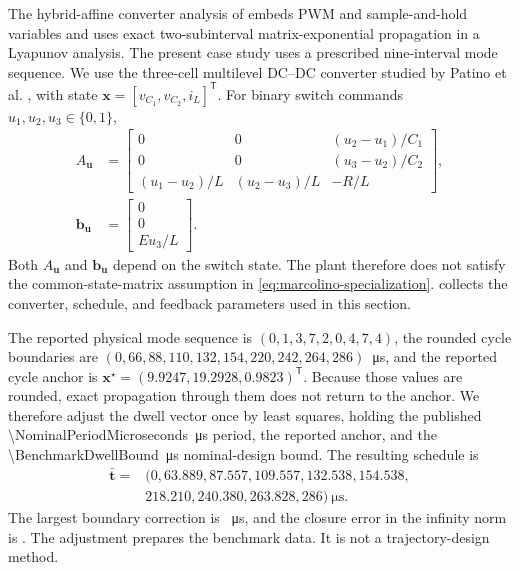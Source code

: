 \documentclass[pdflatex,iicol,sn-mathphys-ay]{sn-jnl}
\newcommand{\vect}[1]{\bm{#1}}
\begin{document}
The hybrid-affine converter analysis of \cite{albea2021hybridAffinePwm} embeds PWM and sample-and-hold variables and uses exact two-subinterval matrix-exponential propagation in a Lyapunov analysis. The present case study uses a prescribed nine-interval mode sequence. We use the three-cell multilevel DC--DC converter studied by Patino et al. \cite{patino2010}, with state $\vect{x}=[v_{C_1},v_{C_2},i_L]^{\mathsf T}$. For binary switch commands $u_1,u_2,u_3\in\{0,1\}$,
\begin{equation}
\begin{aligned}
A_{\vect{u}}&=
\begin{bmatrix}
0&0&(u_2-u_1)/C_1\\
0&0&(u_3-u_2)/C_2\\
(u_1-u_2)/L&(u_2-u_3)/L&-R/L
\end{bmatrix},\\
\vect{b}_{\vect{u}}&=\begin{bmatrix}0\\0\\Eu_3/L\end{bmatrix}.
\end{aligned}
\label{eq:converter}
\end{equation}
Both $A_{\vect{u}}$ and $\vect{b}_{\vect{u}}$ depend on the switch state. The plant therefore does not satisfy the common-state-matrix assumption in \eqref{eq:marcolino-specialization}.  collects the converter, schedule, and feedback parameters used in this section.

The reported physical mode sequence is $(0,1,3,7,2,0,4,7,4)$, the rounded cycle boundaries are $(0,66,88,110,132,154,220,242,264,286)$~\si{\micro\second}, and the reported cycle anchor is $\vect{x}^{\star}=(9.9247,19.2928,0.9823)^{\mathsf T}$. Because those values are rounded, exact propagation through them does not return to the anchor. We therefore adjust the dwell vector once by least squares, holding the published \SI{\NominalPeriodMicroseconds}{\micro\second} period, the reported anchor, and the \SI{\BenchmarkDwellBound}{\micro\second} nominal-design bound. The resulting schedule is
\begin{equation}
\begin{split}
    \bar{\vect{t}}={}&(0,63.889,87.557,109.557,132.538,154.538,\\
    &218.210,240.380,263.828,286)~\si{\micro\second}.
\end{split}
\label{eq:benchmark-schedule}
\end{equation}
The largest boundary correction is \MaximumBoundaryCorrection{}~\si{\micro\second}, and the closure error in the infinity norm is \NominalClosureError{}. The adjustment prepares the benchmark data. It is not a trajectory-design method.
\end{document}
